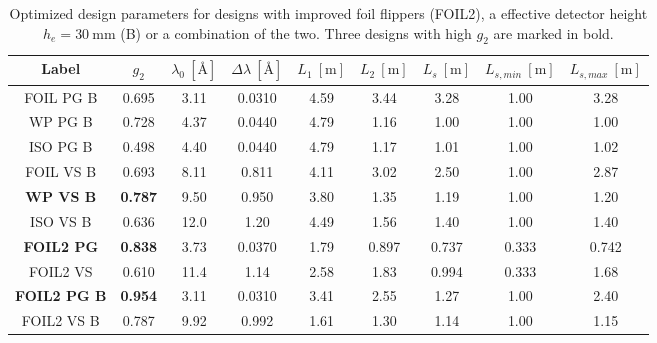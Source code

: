 \begin{table}[h!]
\centering
\begin{tabular}{c | c | c c c c c | c c}
	\toprule
	Label & $g_2$ & $\lambda_0 ~[\unit{\angstrom}]$ & $\Delta\lambda ~[\unit{\angstrom}]$ & $L_1 ~[\unit{\meter}]$ & $L_2 ~[\unit{\meter}]$ & $L_s  ~[\unit{\meter}]$ & $L_{s,min}  ~[\unit{\meter}]$& $L_{s, max}  ~[\unit{\meter}]$\\
	\midrule
	FOIL PG B & \num{0.695} & \num{3.11} & \num{0.0310} & \num{4.59} & \num{3.44} & \num{3.28} & \num{1.00} & \num{3.28} \\
	WP PG B & \num{0.728} & \num{4.37} & \num{0.0440} & \num{4.79} & \num{1.16} & \num{1.00} & \num{1.00} & \num{1.00} \\
	ISO PG B & \num{0.498} & \num{4.40} & \num{0.0440} & \num{4.79} & \num{1.17} & \num{1.01} & \num{1.00} & \num{1.02} \\
	FOIL VS B & \num{0.693} & \num{8.11} & \num{0.811} & \num{4.11} & \num{3.02} & \num{2.50} & \num{1.00} & \num{2.87} \\
	\textbf{WP VS B} & \textbf{0.787} & \num{9.50} & \num{0.950} & \num{3.80} & \num{1.35} & \num{1.19} & \num{1.00} & \num{1.20} \\
	ISO VS B & \num{0.636} & \num{12.0} & \num{1.20} & \num{4.49} & \num{1.56} & \num{1.40} & \num{1.00} & \num{1.40} \\
	\midrule
	\textbf{FOIL2 PG} & \textbf{0.838} & \num{3.73} & \num{0.0370} & \num{1.79} & \num{0.897} & \num{0.737} & \num{0.333} & \num{0.742} \\
	FOIL2 VS & \num{0.610} & \num{11.4} & \num{1.14} & \num{2.58} & \num{1.83} & \num{0.994} & \num{0.333} & \num{1.68} \\
	\textbf{FOIL2 PG B} & \textbf{0.954} & \num{3.11} & \num{0.0310} & \num{3.41} & \num{2.55} & \num{1.27} & \num{1.00} & \num{2.40} \\
	FOIL2 VS B & \num{0.787} & \num{9.92} & \num{0.992} & \num{1.61} & \num{1.30} & \num{1.14} & \num{1.00} & \num{1.15} \\
	\bottomrule
\end{tabular}
\caption{Optimized design parameters for designs with improved foil flippers (FOIL2), a effective detector height $h_e = \SI{30}{\milli\meter}$ (B) or a combination of the two. Three designs with high $g_2$ are marked in bold.}
\label{tab:optimized-designs-boost}
\end{table}

